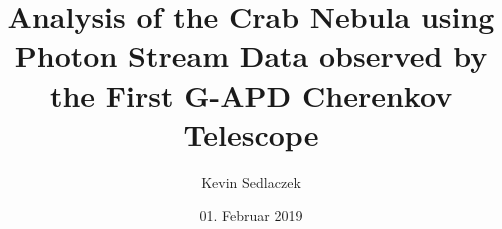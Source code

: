 \documentclass[
  tucolor,
  BCOR=12mm,     %
  parskip=half,  %
  open=any,      %
  cleardoublepage=plain,  %
]{tudothesis}
\author{Kevin Sedlaczek}
\title{Analysis of the Crab Nebula using Photon Stream Data observed by the First G-APD Cherenkov Telescope}
\date{01. Februar 2019}
\begin{document}
\frontmatter
% 
\maketitle

\makecorrectorpage


\tableofcontents

\mainmatter












\appendix


\backmatter
\printbibliography

\cleardoublepage

\end{document}
